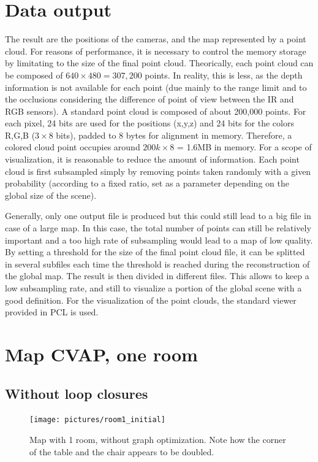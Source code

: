 \section{Data output}

The result are the positions of the cameras, and the map represented by a point cloud. For reasons of performance, it is necessary to control the memory storage by limitating to the size of the final point cloud. Theorically, each point cloud can be composed of $640\times480 = 307,200$ points. In reality, this is less, as the depth information is not available for each point (due mainly to the range limit and to the occlusions considering the difference of point of view between the \gls{IR} and RGB sensors). A standard point cloud is composed of about 200,000 points. For each pixel, 24 bits are used for the positions (x,y,z) and 24 bits for the colors R,G,B ($3\times8$ bits), padded to 8 bytes for alignment in memory. Therefore, a colored cloud point occupies around $200k\times8$ = 1.6MB in memory. For a scope of visualization, it is reasonable to reduce the amount of information. Each point cloud is first subsampled simply by removing points taken randomly with a given probability (according to a fixed ratio, set as a parameter depending on the global size of the scene).

Generally, only one output file is produced but this could still lead to a big file in case of a large map. In this case, the total number of points can still be relatively important and a too high rate of subsampling would lead to a map of low quality. By setting a threshold for the size of the final point cloud file, it can be splitted in several subfiles each time the threshold is reached during the reconstruction of the global map. The result is then divided in different files. This allows to keep a low subsampling rate, and still to visualize a portion of the global scene with a good definition. For the visualization of the point clouds, the standard viewer provided in \gls{PCL} is used.

\section{Map CVAP, one room}

\subsection{Without loop closures}

\begin{figure}[H]
\centering
\texttt{[image: pictures/room1\_initial]}
\caption{Map with 1 room, without graph optimization. Note how the corner of the table and the chair appears to be doubled.}
\end{figure}

